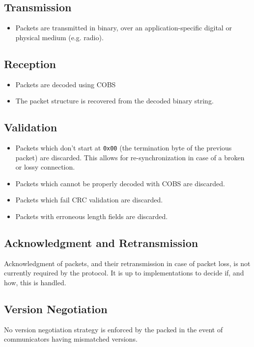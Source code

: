 \documentclass[a4paper,11pt,english]{article}
\begin{document}
\subsection{Transmission}
\begin{itemize}
  \item Packets are transmitted in binary, over an application-specific digital or physical medium (e.g. radio).
\end{itemize}

\subsection{Reception}
\begin{itemize}
  \item Packets are decoded using COBS
  \item The packet structure is recovered from the decoded binary string.
\end{itemize}

\subsection{Validation}
\begin{itemize}
  \item Packets which don't start at \texttt{0x00} (the termination byte of the previous packet) are discarded. This allows for re-synchronization in case of a broken or lossy connection.
  \item Packets which cannot be properly decoded with COBS are discarded.
  \item Packets which fail CRC validation are discarded.
  \item Packets with erroneous length fields are discarded.
\end{itemize}

\subsection{Acknowledgment and Retransmission}
Acknowledgment of packets, and their retransmission in case of packet loss, is not currently required by the protocol. It is up to implementations to decide if, and how, this is handled.

\subsection{Version Negotiation}
No version negotiation strategy is enforced by the packed in the event of communicators having mismatched versions.
\end{document}
